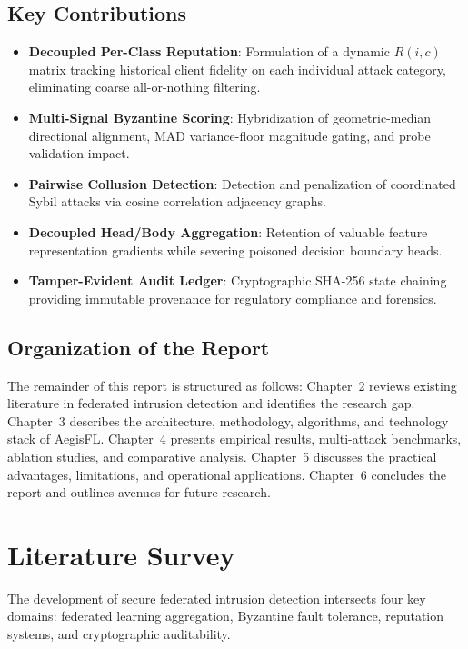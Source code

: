 \documentclass[12pt,a4paper]{report}
\begin{document}
\section{Key Contributions}
\begin{itemize}
    \item \textbf{Decoupled Per-Class Reputation}: Formulation of a dynamic $R(i,c)$ matrix tracking historical client fidelity on each individual attack category, eliminating coarse all-or-nothing filtering.
    \item \textbf{Multi-Signal Byzantine Scoring}: Hybridization of geometric-median directional alignment, MAD variance-floor magnitude gating, and probe validation impact.
    \item \textbf{Pairwise Collusion Detection}: Detection and penalization of coordinated Sybil attacks via cosine correlation adjacency graphs.
    \item \textbf{Decoupled Head/Body Aggregation}: Retention of valuable feature representation gradients while severing poisoned decision boundary heads.
    \item \textbf{Tamper-Evident Audit Ledger}: Cryptographic SHA-256 state chaining providing immutable provenance for regulatory compliance and forensics.
\end{itemize}

\section{Organization of the Report}
The remainder of this report is structured as follows: Chapter~2 reviews existing literature in federated intrusion detection and identifies the research gap. Chapter~3 describes the architecture, methodology, algorithms, and technology stack of AegisFL. Chapter~4 presents empirical results, multi-attack benchmarks, ablation studies, and comparative analysis. Chapter~5 discusses the practical advantages, limitations, and operational applications. Chapter~6 concludes the report and outlines avenues for future research.

\newpage
\chapter{Literature Survey}

The development of secure federated intrusion detection intersects four key domains: federated learning aggregation, Byzantine fault tolerance, reputation systems, and cryptographic auditability.
\end{document}
